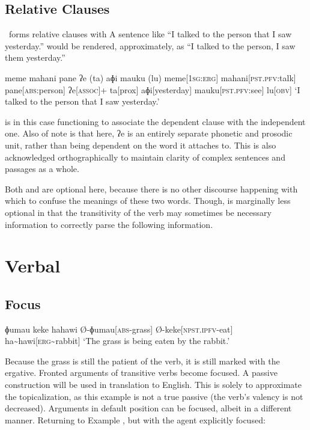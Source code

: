 \section{Relative Clauses}

\langname\ forms relative clauses with  A sentence like ``I talked to the person that I saw yesterday.'' would be rendered, approximately, as ``I talked to the person, I saw them yesterday.''

\ex
\begingl
\glpreamble meme mahani pane ʔe (ta) aɸi mauku (lu)
\endpreamble
meme[\textsc{1sg:erg}]
mahani[\textsc{pst.pfv:}talk]
pane[\textsc{abs:}person]
ʔe[\textsc{assoc}]+
\nogloss{\lbrack}
ta[prox]
aɸi[yesterday]
mauku[\textsc{pst.pfv:}see]
lu[\textsc{obv}]
\nogloss{\rbrack}
\glft `I talked to the person that I saw yesterday.'
\endgl
\xe

 is in this case functioning to associate the dependent clause with the independent one. Also of note is that here, ʔe is an entirely separate phonetic and prosodic unit, rather than being dependent on the word it attaches to. This is also acknowledged orthographically to maintain clarity of complex sentences and passages as a whole.

Both  and  are optional here, because there is no other discourse happening with which to confuse the meanings of these two words. Though,  is marginally less optional in that the transitivity of the verb may sometimes be necessary information to correctly parse the following information.

\chapter{Verbal}

\section{Focus}\label{sec:focus}

\ex
\begingl
\glpreamble ɸumau keke hahawi
\endpreamble
Ø-ɸumau[\textsc{abs-}grass]
Ø-keke[\textsc{npst.ipfv-}eat]
ha\textasciitilde hawi[\textsc{erg\textasciitilde}rabbit]
\glft `The grass is being eaten by the rabbit.'
\endgl
\xe

Because the grass is still the patient of the verb, it is still marked with the ergative. Fronted arguments of transitive verbs become focused. A passive construction will be used in translation to English. This is solely to approximate the topicalization, as this example is not a true passive (the verb's valency is not decreased). Arguments in default position can be focused, albeit in a different manner. Returning to Example , but with the agent explicitly focused:

